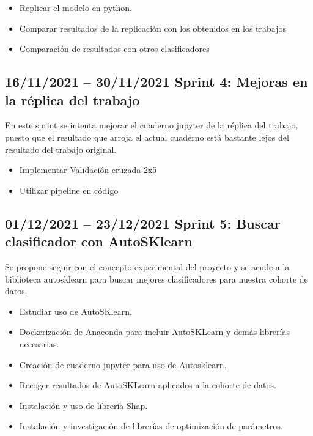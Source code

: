 \begin{itemize}
    \item Replicar el modelo en python.
    \item Comparar resultados de la replicación con los obtenidos en los trabajos
    \item Comparación de resultados con otros clasificadores
\end{itemize}    


\subsection{16/11/2021 – 30/11/2021 \newline Sprint 4: Mejoras en la réplica del trabajo}

En este sprint se intenta mejorar el cuaderno jupyter de la réplica del trabajo, puesto que el resultado que arroja el actual cuaderno está bastante lejos del resultado del trabajo original.

\begin{itemize}
    \item Implementar Validación cruzada 2x5
    \item Utilizar pipeline en código
\end{itemize}


\subsection{01/12/2021 – 23/12/2021 \newline Sprint 5: Buscar clasificador con AutoSKlearn}

Se propone seguir con el concepto experimental del proyecto y se acude a la biblioteca autosklearn para buscar mejores clasificadores para nuestra cohorte de datos.

\begin{itemize}
    \item Estudiar uso de AutoSKlearn.
    \item Dockerización de Anaconda para incluir AutoSKLearn y demás librerías necesarias.
    \item Creación de cuaderno jupyter para uso de Autosklearn.
    \item Recoger resultados de AutoSKLearn aplicados a la cohorte de datos.
    \item Instalación y uso de librería Shap.
    \item Instalación y investigación de librerías de optimización de parámetros.
\end{itemize}



